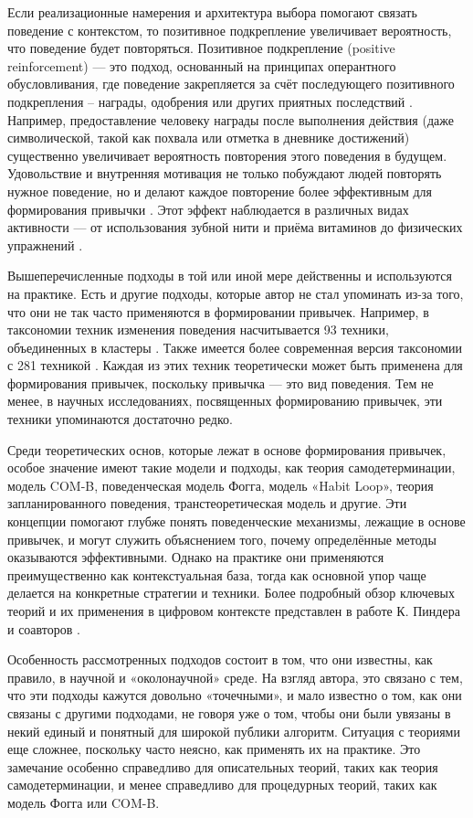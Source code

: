 \documentclass[pdflatex,sn-mathphys-num]{sn-jnl}%
\theoremstyle{thmstyleone}%
\theoremstyle{thmstyletwo}%
\theoremstyle{thmstylethree}%
\begin{document}
Если реализационные намерения и архитектура выбора помогают связать поведение с контекстом, то позитивное подкрепление увеличивает вероятность, что поведение будет повторяться. Позитивное подкрепление (positive reinforcement) — это подход, основанный на принципах оперантного обусловливания, где поведение закрепляется за счёт последующего позитивного подкрепления – награды, одобрения или других приятных последствий \cite{Skinner1953}. Например, предоставление человеку награды после выполнения действия (даже символической, такой как похвала или отметка в дневнике достижений) существенно увеличивает вероятность повторения этого поведения в будущем. Удовольствие и внутренняя мотивация не только побуждают людей повторять нужное поведение, но и делают каждое повторение более эффективным для формирования привычки \cite{Landry2019Positive}. Этот эффект наблюдается в различных видах активности — от использования зубной нити и приёма витаминов до физических упражнений \cite{Judah2018Exploratory, Fremling2025Comparing, Wiedemann2014Intrinsic}.

Вышеперечисленные подходы в той или иной мере действенны и используются на практике. Есть и другие подходы, которые автор не стал упоминать из-за того, что они не так часто применяются в формировании привычек. Например, в таксономии техник изменения поведения насчитывается 93 техники, объединенных в кластеры \cite{michie_2008_bct}. Также имеется более современная версия таксономии с 281 техникой \cite{ontology_bct}. Каждая из этих техник теоретически может быть применена для формирования привычек, поскольку привычка — это вид поведения. Тем не менее, в научных исследованиях, посвященных формированию привычек, эти техники упоминаются достаточно редко.

Среди теоретических основ, которые лежат в основе формирования привычек, особое значение имеют такие модели и подходы, как теория самодетерминации, модель COM-B, поведенческая модель Фогга, модель «Habit Loop», теория запланированного поведения, транстеоретическая модель и другие. Эти концепции помогают глубже понять поведенческие механизмы, лежащие в основе привычек, и могут служить объяснением того, почему определённые методы оказываются эффективными. Однако на практике они применяются преимущественно как контекстуальная база, тогда как основной упор чаще делается на конкретные стратегии и техники. Более подробный обзор ключевых теорий и их применения в цифровом контексте представлен в работе К. Пиндера и соавторов \cite{10.1145/3196830}.

Особенность рассмотренных подходов состоит в том, что они известны, как правило, в научной и «околонаучной» среде. На взгляд автора, это связано с тем, что эти подходы кажутся довольно «точечными», и мало известно о том, как они связаны с другими подходами, не говоря уже о том, чтобы они были увязаны в некий единый и понятный для широкой публики алгоритм. Ситуация с теориями еще сложнее, поскольку часто неясно, как применять их на практике. Это замечание особенно справедливо для описательных теорий, таких как теория самодетерминации, и менее справедливо для процедурных теорий, таких как модель Фогга или COM-B.
\end{document}
